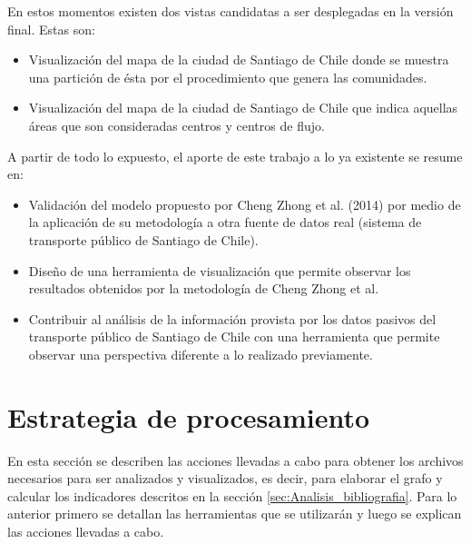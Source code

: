 \documentclass[12pt]{article}
\begin{document}
	En estos momentos existen dos vistas candidatas a ser desplegadas en la versión final. Estas son:
	
	\begin{itemize}
		\item Visualización del mapa de la ciudad de Santiago de Chile  donde se muestra una partición de ésta por el procedimiento que genera las comunidades.
		\item Visualización del mapa de la ciudad de Santiago de Chile  que indica aquellas áreas que son consideradas centros y centros de flujo.
	\end{itemize}		
	
	A partir de todo lo expuesto, el aporte de este trabajo a lo ya existente se resume en:
	
	\begin{itemize}
	\item Validación del modelo propuesto por Cheng Zhong et al. (2014) \cite{Estructura_urbana} por medio de la aplicación de su metodología a otra fuente de datos real (sistema de transporte público de Santiago de Chile).
	\item Diseño de una herramienta de visualización que permite observar los resultados obtenidos por la metodología de Cheng Zhong et al.
	\item Contribuir al análisis de la información provista por los datos pasivos del transporte público de Santiago de Chile con una herramienta que permite observar una perspectiva diferente a lo realizado previamente.
	
	\end{itemize}
	
    \newpage
    \section{Estrategia de procesamiento}

    
	En esta sección se describen las acciones llevadas a cabo para obtener los archivos necesarios para ser analizados y visualizados, es decir, para elaborar el grafo y calcular los indicadores descritos en la sección \ref{sec:Analisis_bibliografia}. Para lo anterior primero se detallan las herramientas que se utilizarán y luego se explican las acciones llevadas a cabo.
\end{document}
